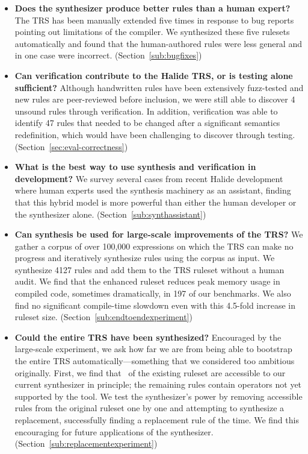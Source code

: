 \documentclass[acmsmall,review]{acmart}\settopmatter{printfolios=true,printccs=false,printacmref=false}
\newcommand{\NumRulesFixed}{{\color{black} 4}\xspace}
\newcommand{\NumRulesSynthesized}{{\color{black} 4127}\xspace}
\begin{document}
\begin{itemize}
  \item \textbf{Does the synthesizer produce better rules than a human expert?} The TRS has been manually extended five times in response to bug reports pointing out limitations of the compiler. We synthesized these five rulesets automatically and found that the human-authored rules were less general and in one case were incorrect. (Section~\ref{sub:bugfixes})
  \item \textbf{Can verification contribute to the Halide TRS, or is testing alone sufficient?} Although handwritten rules have been extensively fuzz-tested and new rules are peer-reviewed before inclusion, we were still able to discover \NumRulesFixed unsound rules through verification. In addition, verification was able to identify 47 rules that needed to be changed after a significant semantics redefinition, which would have been challenging to discover through testing. (Section~\ref{sec:eval-correctness})
  \item \textbf{What is the best way to use synthesis and verification in development?} We survey several cases from recent Halide development where human experts used the synthesis machinery as an assistant, finding that this hybrid model is more powerful than either the human developer or the synthesizer alone. (Section~\ref{sub:synthassistant})
  \item \textbf{Can synthesis be used for large-scale improvements of the TRS?} We gather a corpus of over 100,000 expressions on which the TRS can make no progress and iteratively synthesize rules using the corpus as input. We synthesize \NumRulesSynthesized  rules and add them to the TRS ruleset without a human audit. We find that the enhanced ruleset reduces peak memory usage in compiled code, sometimes dramatically, in 197 of our benchmarks. We also find no significant compile-time slowdown even with this 4.5-fold increase in ruleset size. (Section~\ref{sub:endtoendexperiment})
  \item \textbf{Could the entire TRS have been synthesized?} Encouraged by the large-scale experiment, we ask how far we are from being able to bootstrap the entire TRS automatically---something that we considered too ambitious originally. First, we find that \PercentPossibleToSynth~of the existing ruleset are accessible to our current synthesizer in principle; the remaining rules contain operators not yet supported by the tool. %
  We test the synthesizer's power by removing \NumRulesInCorrectnessExperiment{} accessible rules from the original ruleset one by one and attempting to synthesize a replacement, successfully finding a replacement rule \PercentRulesResynthesized{} of the time.  We find this encouraging for future applications of the synthesizer. (Section~\ref{sub:replacementexperiment})
\end{itemize}
\end{document}
